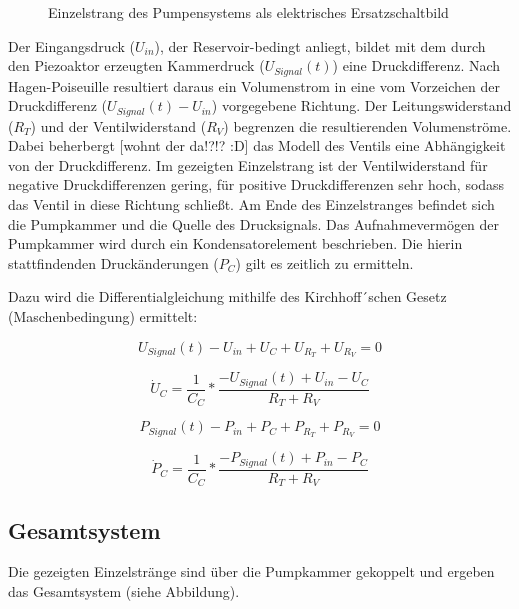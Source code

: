 \documentclass[fontsize=12pt, a4paper]{scrartcl}
\begin{document}
\begin{figure}[H]
	
	\caption{Einzelstrang des Pumpensystems als elektrisches Ersatzschaltbild}
	\label{singlebranch}
\end{figure}

Der Eingangsdruck ($U_{in}$), der Reservoir-bedingt anliegt, bildet mit dem durch den Piezoaktor erzeugten Kammerdruck ($U_{Signal}(t)$) eine Druckdifferenz. Nach Hagen-Poiseuille resultiert daraus ein Volumenstrom in eine vom Vorzeichen der Druckdifferenz ($U_{Signal}(t)-U_{in}$) vorgegebene Richtung. Der Leitungswiderstand ($R_{T}$) und der Ventilwiderstand ($R_{V}$) begrenzen die resultierenden Volumenströme. Dabei beherbergt [wohnt der da!?!? :D] das Modell des Ventils eine Abhängigkeit von der Druckdifferenz. Im gezeigten Einzelstrang ist der Ventilwiderstand für negative Druckdifferenzen gering, für positive Druckdifferenzen sehr hoch, sodass das Ventil in diese Richtung schließt. Am Ende des Einzelstranges befindet sich die Pumpkammer und die Quelle des Drucksignals. Das Aufnahmevermögen der Pumpkammer wird durch ein Kondensatorelement beschrieben. Die hierin stattfindenden Druckänderungen ($P_{C}$) gilt es zeitlich zu ermitteln.

Dazu wird die Differentialgleichung mithilfe des Kirchhoff´schen Gesetz (Maschenbedingung) ermittelt:

\begin{equation}
	U_{Signal}(t) - U_{in} + U_{C} + U_{R_{T}} + U_{R_{V}} = 0
\end{equation}

\begin{equation}
	\dot{U}_{C} = \frac{1}{C_{C}} * \frac{-U_{Signal}(t)+U_{in}-U_{C}}{R_{T}+R_{V}}
\end{equation}

\begin{equation}
	P_{Signal}(t) - P_{in} + P_{C} + P_{R_{T}} + P_{R_{V}} = 0
\end{equation}

\begin{equation}
	\dot{P}_{C} = \frac{1}{C_{C}} * \frac{-P_{Signal}(t)+P_{in}-P_{C}}{R_{T}+R_{V}}
\end{equation}


\subsection{Gesamtsystem}

Die gezeigten Einzelstränge sind über die Pumpkammer gekoppelt und ergeben das Gesamtsystem (siehe Abbildung).
\end{document}
